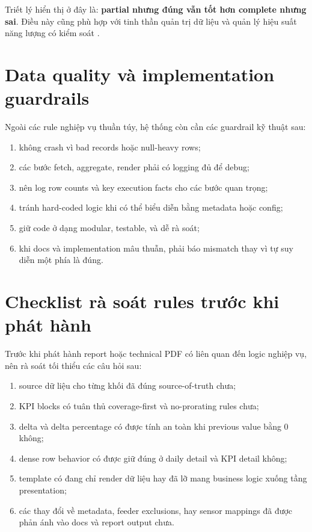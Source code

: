 Triết lý hiển thị ở đây là: \textbf{partial nhưng đúng vẫn tốt hơn complete nhưng sai}. Điều này cũng phù hợp với tinh thần quản trị dữ liệu và quản lý hiệu suất năng lượng có kiểm soát \cite{ref_iso50001}.

\section{Data quality và implementation guardrails}

Ngoài các rule nghiệp vụ thuần túy, hệ thống còn cần các guardrail kỹ thuật sau:

\begin{enumerate}[label=-]
\item không crash vì bad records hoặc null-heavy rows;
\item các bước fetch, aggregate, render phải có logging đủ để debug;
\item nên log row counts và key execution facts cho các bước quan trọng;
\item tránh hard-coded logic khi có thể biểu diễn bằng metadata hoặc config;
\item giữ code ở dạng modular, testable, và dễ rà soát;
\item khi docs và implementation mâu thuẫn, phải báo mismatch thay vì tự suy diễn một phía là đúng.
\end{enumerate}

\section{Checklist rà soát rules trước khi phát hành}

Trước khi phát hành report hoặc technical PDF có liên quan đến logic nghiệp vụ, nên rà soát tối thiểu các câu hỏi sau:

\begin{enumerate}[label=-]
\item source dữ liệu cho từng khối đã đúng source-of-truth chưa;
\item KPI blocks có tuân thủ coverage-first và no-prorating rules chưa;
\item delta và delta percentage có được tính an toàn khi previous value bằng 0 không;
\item dense row behavior có được giữ đúng ở daily detail và KPI detail không;
\item template có đang chỉ render dữ liệu hay đã lỡ mang business logic xuống tầng presentation;
\item các thay đổi về metadata, feeder exclusions, hay sensor mappings đã được phản ánh vào docs và report output chưa.
\end{enumerate}

